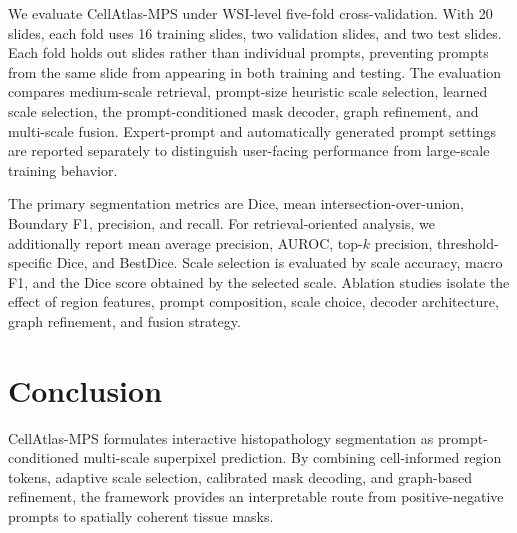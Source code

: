 \documentclass[letterpaper]{article} %
\begin{document}
We evaluate CellAtlas-MPS under WSI-level five-fold cross-validation. With 20 slides, each fold uses 16 training slides, two validation slides, and two test slides. Each fold holds out slides rather than individual prompts, preventing prompts from the same slide from appearing in both training and testing. The evaluation compares medium-scale retrieval, prompt-size heuristic scale selection, learned scale selection, the prompt-conditioned mask decoder, graph refinement, and multi-scale fusion. Expert-prompt and automatically generated prompt settings are reported separately to distinguish user-facing performance from large-scale training behavior.

The primary segmentation metrics are Dice, mean intersection-over-union, Boundary F1, precision, and recall. For retrieval-oriented analysis, we additionally report mean average precision, AUROC, top-$k$ precision, threshold-specific Dice, and BestDice. Scale selection is evaluated by scale accuracy, macro F1, and the Dice score obtained by the selected scale. Ablation studies isolate the effect of region features, prompt composition, scale choice, decoder architecture, graph refinement, and fusion strategy.

\section{Conclusion}

CellAtlas-MPS formulates interactive histopathology segmentation as prompt-conditioned multi-scale superpixel prediction. By combining cell-informed region tokens, adaptive scale selection, calibrated mask decoding, and graph-based refinement, the framework provides an interpretable route from positive-negative prompts to spatially coherent tissue masks.

% 
\end{document}
